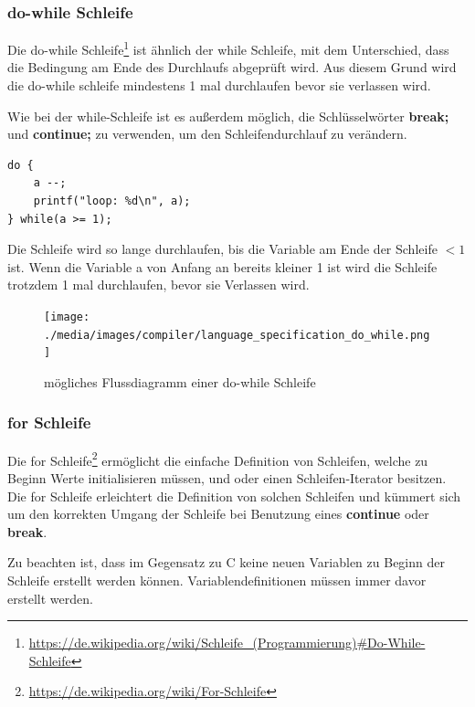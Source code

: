 \newpage
\subsubsection{do-while Schleife}

Die do-while Schleife\footnote{\url{https://de.wikipedia.org/wiki/Schleife_(Programmierung)\#Do-While-Schleife}} ist \"ahnlich der while Schleife, mit dem Unterschied, dass die Bedingung am Ende des Durchlaufs abgepr\"uft wird. Aus diesem Grund wird die do-while schleife mindestens 1 mal durchlaufen bevor sie verlassen wird.

Wie bei der while-Schleife ist es au\ss{}erdem m\"oglich, die Schl\"usselw\"orter \textbf{break;} und \textbf{continue;} zu verwenden, um den Schleifendurchlauf zu ver\"andern.


\begin{lstlisting}[language=CMM]
do {
	a --;
	printf("loop: %d\n", a);
} while(a >= 1);
\end{lstlisting}

Die Schleife wird so lange durchlaufen, bis die Variable am Ende der Schleife $< 1$ ist. Wenn die Variable a von Anfang an bereits kleiner 1 ist wird die Schleife trotzdem 1 mal durchlaufen, bevor sie Verlassen wird.

\begin{figure}[h]
\centering
\texttt{[image: ./media/images/compiler/language\_specification\_do\_while.png]}
\caption{m\"ogliches Flussdiagramm einer do-while Schleife}
\label{language_specification_do_while}
\end{figure}

\newpage
\subsubsection{for Schleife}

Die for Schleife\footnote{\url{https://de.wikipedia.org/wiki/For-Schleife}} erm\"oglicht die einfache Definition von Schleifen, welche zu Beginn Werte initialisieren m\"ussen, und oder einen Schleifen-Iterator besitzen. Die for Schleife erleichtert die Definition von solchen Schleifen und k\"ummert sich um den korrekten Umgang der Schleife bei Benutzung eines \textbf{continue} oder \textbf{break}.

Zu beachten ist, dass im Gegensatz zu C keine neuen Variablen zu Beginn der Schleife erstellt werden k\"onnen. Variablendefinitionen m\"ussen immer davor erstellt werden.

